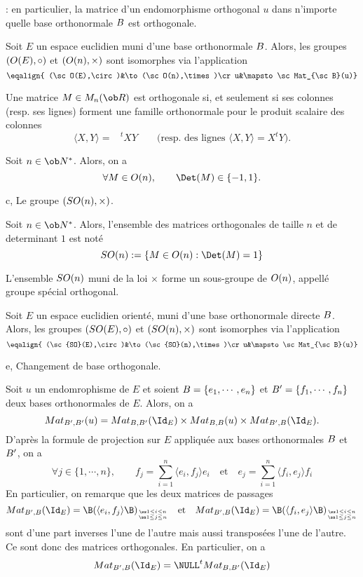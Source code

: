 \Remarque : en particulier, la matrice d'un endomorphisme orthogonal $u$ dans n'importe quelle base orthonormale $\sc B$ est orthogonale. 
\bigskip

\Propriete []  Soit $E$ un espace euclidien muni d'une base orthonormale $\sc B$. Alors, les groupes $(\sc O(E),\circ)$ et $(\sc O(n),\times)$ sont isomorphes via l'application 
$$
\eqalign{ (\sc O(E),\circ)&\to(\sc O(n),\times)\cr  u&\mapsto\sc Mat_{\sc B}(u)}
$$

\Propriete []  Une matrice $M\in\sc M_n(\ob R)$ est orthogonale si, et seulement si ses colonnes (resp. ses lignes) forment une famille orthonormale pour le produit scalaire des colonnes 
$$
\langle X,Y\rangle=\phantom{\!\!\!\!\!\!X}^tXY \qquad \mbox{(resp. des lignes $\langle X,Y\rangle=X^tY$).} 
$$

\Propriete []  Soit $n\in\ob N^*$. Alors, on a 
$$
\forall M\in\sc O(n),\qquad \Det(M)\in\{-1,1\}.
$$



\Subsection c, Le groupe $(\sc{SO}(n),\times)$. 

\Definition []  Soit $n\in\ob N^*$. 
Alors, l'ensemble des matrices orthogonales de taille $n$ et de determinant $1$ est not\'e 
$$
\sc{SO}(n):=\{M\in\sc O(n):\Det(M)=1\}
$$

\Propriete []  L'ensemble $\sc{SO}(n)$ muni de la loi $\times$ forme un sous-groupe de $\sc O(n)$, 
appell\'e groupe sp\'ecial orthogonal. 
\bigskip

\Propriete []  Soit $E$ un espace euclidien orient\'e, muni d'une base orthonormale directe $\sc B$. Alors, les groupes $(\sc{SO}(E),\circ)$ et $(\sc{SO}(n),\times)$ sont isomorphes via l'application 
$$
\eqalign{ (\sc{SO}(E),\circ)&\to(\sc{SO}(n),\times)\cr  u&\mapsto \sc Mat_{\sc B}(u)}
$$

\Subsection e, Changement de base orthogonale.


\Propriete[Title=Changement de base orthonormale]
Soit $u$ un endomrophisme de $E$ et soient $\sc B=\{e_1,\cdots,e_n\}$ et $\sc B'=\{f_1,\cdots,f_n\}$ deux bases orthonormales de $E$. 
Alors, on a 
$$
\sc Mat_{\sc B',\sc B'}(u)=\sc Mat_{\sc B,\sc B'}(\Id_E)\times\sc Mat_{\sc B,\sc B}(u)\times\sc Mat_{\sc B',\sc B}(\Id_E).
$$
D'apr\`es la formule de projection sur $E$ appliqu\'ee aux bases orthonormales $\sc B$ et $\sc B'$, on a 
$$
\forall j\in\{1,\cdots,n\}, \qquad f_j=\sum_{i=1}^n\langle e_i,f_j\rangle e_i\quad\mbox{et}\quad e_j=\sum_{i=1}^n\langle f_i,e_j\rangle f_i
$$
En particulier, on remarque que les deux matrices de passages 
$$
\sc Mat_{\sc B',\sc B}(\Id_E)=\B(\langle e_i,f_j\rangle\B)_{\ss1\le i\le n\atop\ss1\le j\le n}\quad \mbox{et}\quad \sc Mat_{\sc B',\sc B}(\Id_E)=\B(\langle f_i,e_j\rangle\B)_{\ss1\le i\le n\atop\ss1\le j\le n}
$$
sont d'une part inverses l'une de l'autre mais aussi transpos\'ees l'une de l'autre. Ce sont donc des matrices orthogonales. En particulier, on a 
$$
\sc Mat_{\sc B',\sc B}(\Id_E)=\NULL^t\sc Mat_{\sc B,\sc B'}(\Id_E)
$$

